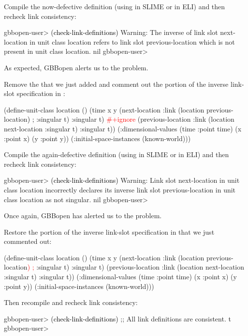 \documentclass[10pt,twoside,english,pdftex]{article}
\begin{document}
Compile the now-defective definition (using  in SLIME or
 in ELI) and then recheck link consistency:
%
\W\supp
\begin{example}
\textcolor{darkergray}{%
  gbbopen-user> \textcolor{black}{(check-link-definitions)}
  Warning: The inverse of link slot next-location in unit class location 
           refers to link slot previous-location which is not present in 
           unit class location.
  nil
  gbbopen-user>}
\end{example}
%
As expected, GBBopen alerts us to the problem.

Remove the  that we just added and comment out the
 portion of the inverse link-slot specification in 
:
%
\W\supp
\begin{example}
\textcolor{darkergray}{%
  (define-unit-class location ()
    (time 
     x y
     (next-location
      :link (location previous-location\textcolor{black}{) ;} :singular t) 
      :singular t)
      \textcolor{red}{#+ignore}     
     (previous-location
      :link (location next-location :singular t)  
      :singular t))
    (:dimensional-values
      (time :point time)
      (x :point x)
      (y :point y))
    (:initial-space-instances (known-world)))}
\end{example}
%
Compile the again-defective definition (using  in SLIME or
 in ELI) and then recheck link consistency:
%
\W\supp\notpretop
\begin{example}
\textcolor{darkergray}{%
  gbbopen-user> \textcolor{black}{(check-link-definitions)}
  Warning: Link slot next-location in unit class location incorrectly 
           declares its inverse link slot previous-location in unit 
           class location as not singular.
  nil
  gbbopen-user>}
\end{example}
%
Once again, GBBopen has alerted us to the problem.

Restore the  portion of the inverse link-slot
specification in  that we just commented out:
%
\W\supp
\begin{example}
\textcolor{darkergray}{%
  (define-unit-class location ()
    (time 
     x y
     (next-location
      :link (location previous-location\textcolor{red}{) ;} :singular t) 
      :singular t)
     (previous-location
      :link (location next-location :singular t)  
      :singular t))
    (:dimensional-values
      (time :point time)
      (x :point x)
      (y :point y))
    (:initial-space-instances (known-world)))}
\end{example}
%
Then recompile and recheck link consistency:
%
\W\supp\notpretop
\begin{example}
\textcolor{darkergray}{%
  gbbopen-user> \textcolor{black}{(check-link-definitions)}
  ;; All link definitions are consistent.
  t
  gbbopen-user>}
\end{example}
\end{document}
